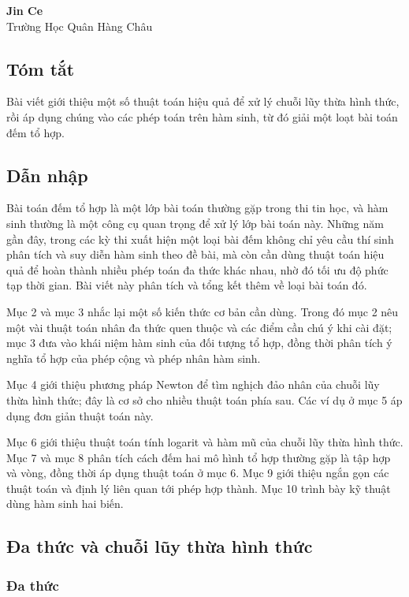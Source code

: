 \documentclass[11pt]{article}
\begin{document}
\begin{center}
\textbf{Jin Ce}\\
Trường Học Quân Hàng Châu
\end{center}

\subsection*{Tóm tắt}

Bài viết giới thiệu một số thuật toán hiệu quả để xử lý chuỗi lũy thừa hình
thức, rồi áp dụng chúng vào các phép toán trên hàm sinh, từ đó giải một loạt
bài toán đếm tổ hợp.

\subsection{Dẫn nhập}

Bài toán đếm tổ hợp là một lớp bài toán thường gặp trong thi tin học, và hàm
sinh thường là một công cụ quan trọng để xử lý lớp bài toán này. Những năm gần
đây, trong các kỳ thi xuất hiện một loại bài đếm không chỉ yêu cầu thí sinh
phân tích và suy diễn hàm sinh theo đề bài, mà còn cần dùng thuật toán hiệu quả
để hoàn thành nhiều phép toán đa thức khác nhau, nhờ đó tối ưu độ phức tạp thời
gian. Bài viết này phân tích và tổng kết thêm về loại bài toán đó.

Mục 2 và mục 3 nhắc lại một số kiến thức cơ bản cần dùng. Trong đó mục 2 nêu
một vài thuật toán nhân đa thức quen thuộc và các điểm cần chú ý khi cài đặt;
mục 3 đưa vào khái niệm hàm sinh của đối tượng tổ hợp, đồng thời phân tích ý
nghĩa tổ hợp của phép cộng và phép nhân hàm sinh.

Mục 4 giới thiệu phương pháp Newton để tìm nghịch đảo nhân của chuỗi lũy thừa
hình thức; đây là cơ sở cho nhiều thuật toán phía sau. Các ví dụ ở mục 5 áp
dụng đơn giản thuật toán này.

Mục 6 giới thiệu thuật toán tính logarit và hàm mũ của chuỗi lũy thừa hình
thức. Mục 7 và mục 8 phân tích cách đếm hai mô hình tổ hợp thường gặp là tập
hợp và vòng, đồng thời áp dụng thuật toán ở mục 6. Mục 9 giới thiệu ngắn gọn
các thuật toán và định lý liên quan tới phép hợp thành. Mục 10 trình bày kỹ
thuật dùng hàm sinh hai biến.

\subsection{Đa thức và chuỗi lũy thừa hình thức}

\subsubsection{Đa thức}
\end{document}
